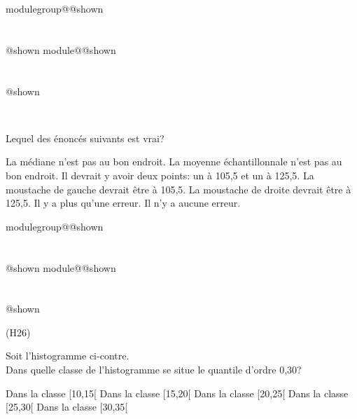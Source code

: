 \documentclass{Evaluation}
\makeatletter
\newcommand{\currentmodulekey}{}
\newcommand{\currentmoduletitle}{}
\newcommand{\currentgroupkey}{}
\newcommand{\currentgrouptitle}{}
\newcommand{\showmoduleifneeded}{%
  \ifx\currentgroupkey\empty\else
    \expandafter\ifx\csname modulegroup@\currentgroupkey @shown\endcsname\relax
      \section*{\currentgrouptitle}%
      \expandafter\gdef\csname modulegroup@\currentgroupkey @shown\endcsname{1}%
    \fi
  \fi
  \expandafter\ifx\csname module@\currentmodulekey @shown\endcsname\relax
    \section*{\currentmoduletitle}%
    \expandafter\gdef\csname module@\currentmodulekey @shown\endcsname{1}%
  \fi
}
\newenvironment{H25}{\showmoduleifneeded}{}
\newenvironment{H26}{\showmoduleifneeded}{}
\makeatother
\begin{document}
\begin{questions}
\begin{H25}
\begin{center}
\\
	\end{center}

Lequel des énoncés suivants est vrai?

  \begin{checkboxes}
\choice La médiane n'est pas au bon endroit.  %
\choice La moyenne échantillonnale n'est pas au bon endroit. %
\choice Il devrait y avoir deux points: un à 105,5 et un à 125,5.
\choice La moustache de gauche devrait être à  105,5. 
\choice La moustache de droite devrait être à 125,5.
\choice Il y a plus qu'une erreur.
\choice Il n'y a aucune erreur.
\end{checkboxes}

\vspace{1cm}
\end{H25}

\begin{H26}
\question
(H26)
\noindent
\begin{minipage}[t]{0.5\linewidth}\vspace{0pt}
Soit l'histogramme ci-contre.\\[0.5em]

Dans quelle classe de l'histogramme se situe le quantile d'ordre 0,30?

\begin{checkboxes}
  \choice Dans la classe [10,15[
  \correctchoice Dans la classe [15,20[
  \choice Dans la classe [20,25[
  \choice Dans la classe [25,30[
  \choice Dans la classe [30,35[
\end{checkboxes}
\end{minipage}\hfill
\begin{minipage}[t]{0.42\linewidth}\vspace{0pt}
\centering
{}
\end{minipage}
\end{H26}
\end{questions}
\end{document}
